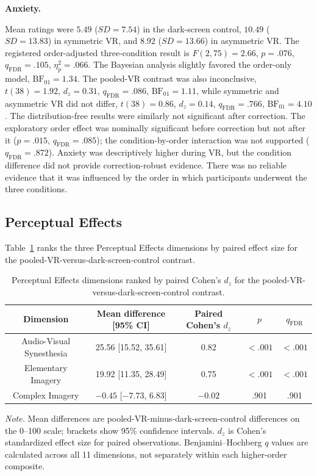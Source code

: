 \documentclass[pdflatex,sn-basic,lineno]{../sn-jnl}
\begin{document}
\medskip\noindent\textbf{Anxiety.}\nopagebreak[4]

Mean ratings were $5.49$ ($SD=7.54$) in the dark-screen control, $10.49$ ($SD=13.83$) in symmetric VR, and $8.92$ ($SD=13.66$) in asymmetric VR. The registered order-adjusted three-condition result is $F(2,75)=2.66$, $p=.076$, $q_{\mathrm{FDR}}=.105$, $\eta_p^2=.066$. The Bayesian analysis slightly favored the order-only model, $\mathrm{BF}_{01}=1.34$. The pooled-VR contrast was also inconclusive, $t(38)=1.92$, $d_z=0.31$, $q_{\mathrm{FDR}}=.086$, $\mathrm{BF}_{01}=1.11$, while symmetric and asymmetric VR did not differ, $t(38)=0.86$, $d_z=0.14$, $q_{\mathrm{FDR}}=.766$, $\mathrm{BF}_{01}=4.10$. The distribution-free results were similarly not significant after correction. The exploratory order effect was nominally significant before correction but not after it ($p=.015$, $q_{\mathrm{FDR}}=.085$); the condition-by-order interaction was not supported ($q_{\mathrm{FDR}}=.872$). Anxiety was descriptively higher during VR, but the condition difference did not provide correction-robust evidence. There was no reliable evidence that it was influenced by the order in which participants underwent the three conditions.

\subsection{Perceptual Effects}
\label{subsec:supp_asc_perceptual}

Table~\ref{tab:supp_asc_perceptual_drivers} ranks the three Perceptual Effects dimensions by paired effect size for the pooled-VR-versus-dark-screen-control contrast.

\begin{table}[!htbp]
\centering
\small
\setlength{\tabcolsep}{3pt}
\caption{Perceptual Effects dimensions ranked by paired Cohen's $d_z$ for the pooled-VR-versus-dark-screen-control contrast.}
\label{tab:supp_asc_perceptual_drivers}
\begin{tabular*}{\textwidth}{@{\extracolsep{\fill}}ccccc@{}}
\toprule
Dimension & Mean difference [95\% CI] & Paired Cohen's $d_z$ & $p$ & $q_{\mathrm{FDR}}$ \\
\midrule
Audio-Visual Synesthesia & 25.56 [15.52, 35.61] & 0.82 & $<.001$ & $<.001$ \\
Elementary Imagery & 19.92 [11.35, 28.49] & 0.75 & $<.001$ & $<.001$ \\
Complex Imagery & $-0.45$ [$-7.73$, 6.83] & $-0.02$ & .901 & .901 \\
\bottomrule
\end{tabular*}
\par\smallskip
\parbox{\textwidth}{\footnotesize\textit{Note.} Mean differences are pooled-VR-minus-dark-screen-control differences on the 0--100 scale; brackets show 95\% confidence intervals. $d_z$ is Cohen's standardized effect size for paired observations. Benjamini--Hochberg $q$ values are calculated across all 11 dimensions, not separately within each higher-order composite.}
\end{table}
\FloatBarrier
\end{document}
